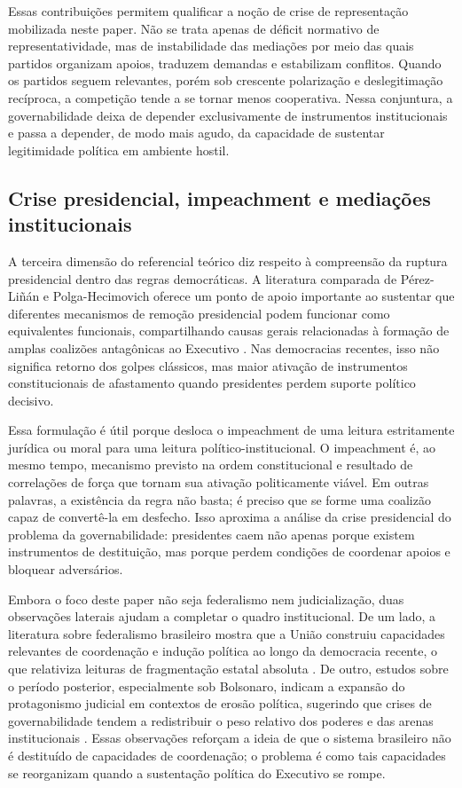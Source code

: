 \documentclass[12pt,a4paper]{article}
\begin{document}
Essas contribuições permitem qualificar a noção de crise de representação mobilizada neste paper. Não se trata apenas de déficit normativo de representatividade, mas de instabilidade das mediações por meio das quais partidos organizam apoios, traduzem demandas e estabilizam conflitos. Quando os partidos seguem relevantes, porém sob crescente polarização e deslegitimação recíproca, a competição tende a se tornar menos cooperativa. Nessa conjuntura, a governabilidade deixa de depender exclusivamente de instrumentos institucionais e passa a depender, de modo mais agudo, da capacidade de sustentar legitimidade política em ambiente hostil.

\subsection{Crise presidencial, impeachment e mediações institucionais}
\label{sec:org980ef29}
A terceira dimensão do referencial teórico diz respeito à compreensão da ruptura presidencial dentro das regras democráticas. A literatura comparada de Pérez-Liñán e Polga-Hecimovich oferece um ponto de apoio importante ao sustentar que diferentes mecanismos de remoção presidencial podem funcionar como equivalentes funcionais, compartilhando causas gerais relacionadas à formação de amplas coalizões antagônicas ao Executivo \textcite{perez_lian2016_explaining_military}. Nas democracias recentes, isso não significa retorno dos golpes clássicos, mas maior ativação de instrumentos constitucionais de afastamento quando presidentes perdem suporte político decisivo.

Essa formulação é útil porque desloca o impeachment de uma leitura estritamente jurídica ou moral para uma leitura político-institucional. O impeachment é, ao mesmo tempo, mecanismo previsto na ordem constitucional e resultado de correlações de força que tornam sua ativação politicamente viável. Em outras palavras, a existência da regra não basta; é preciso que se forme uma coalizão capaz de convertê-la em desfecho. Isso aproxima a análise da crise presidencial do problema da governabilidade: presidentes caem não apenas porque existem instrumentos de destituição, mas porque perdem condições de coordenar apoios e bloquear adversários.

Embora o foco deste paper não seja federalismo nem judicialização, duas observações laterais ajudam a completar o quadro institucional. De um lado, a literatura sobre federalismo brasileiro mostra que a União construiu capacidades relevantes de coordenação e indução política ao longo da democracia recente, o que relativiza leituras de fragmentação estatal absoluta \textcite{oliveira2019_momentos_da}. De outro, estudos sobre o período posterior, especialmente sob Bolsonaro, indicam a expansão do protagonismo judicial em contextos de erosão política, sugerindo que crises de governabilidade tendem a redistribuir o peso relativo dos poderes e das arenas institucionais \textcite{vieira2022_supremocracia_e}. Essas observações reforçam a ideia de que o sistema brasileiro não é destituído de capacidades de coordenação; o problema é como tais capacidades se reorganizam quando a sustentação política do Executivo se rompe.
\end{document}
